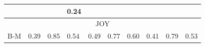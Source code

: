 \documentclass[11pt]{article}
\begin{document}
\begin{table}[ht]
\begin{tabular}{|l||l|l|l||l|l|l||l|l|l|}
\hline
    \tiny{\cite{danisman2008feeler} } &
    \footnotesize{} & 
    \footnotesize{} & 
    \footnotesize{0.24} &
    \footnotesize{} & 
    \footnotesize{} & 
    \footnotesize{} &
    \footnotesize{} & 
    \footnotesize{} & 
    \footnotesize{} \\


%
%
%
%
%
%
%

\hline
\hline

    \multicolumn{10}{|c|}{{JOY}} \\ 

\hline
    \tiny{B-M} & 
    \footnotesize{0.39} & 
    \footnotesize{0.85} & 
    \footnotesize{0.54} & 
    \footnotesize{0.49} & 
    \footnotesize{{0.77}} & 
    \footnotesize{0.60} & 
    \footnotesize{{0.41}} & 
    \footnotesize{{0.79}} & 
    \footnotesize{{0.53}} \\ 


\end{tabular}
\end{table}
\end{document}
